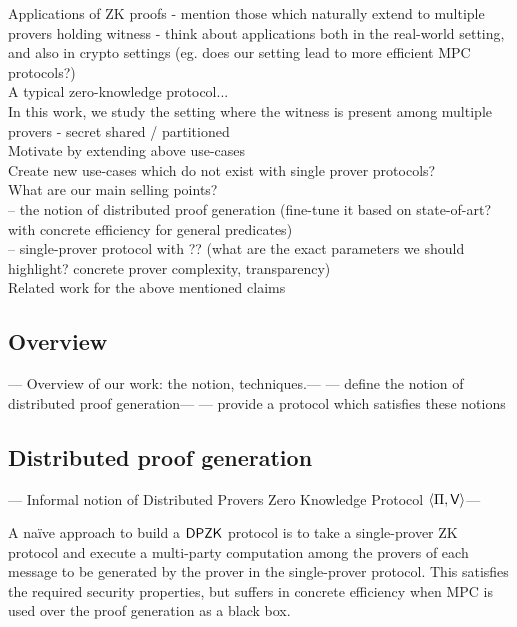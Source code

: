 Applications of ZK proofs - mention those which naturally extend to multiple provers holding witness - think about applications both in the real-world setting, and also in crypto settings (eg. does our setting lead to more efficient MPC protocols?)\\

A typical zero-knowledge protocol...\\
In this work, we study the setting where the witness is present among multiple provers - secret shared / partitioned \\
Motivate by extending above use-cases\\
Create new use-cases which do not exist with single prover protocols?\\

What are our main selling points?\\
-- the notion of distributed proof generation (fine-tune it based on state-of-art? with concrete efficiency for general predicates)\\
-- single-prover protocol with ?? (what are the exact parameters we should highlight? concrete prover complexity, transparency)\\

Related work for the above mentioned claims

\subsection{Overview}
--- Overview of our work: the notion, techniques.--- 
--- define the notion of distributed proof generation--- 
--- provide a protocol which satisfies these notions

\subsection*{Distributed proof generation}
--- Informal notion of Distributed Provers Zero Knowledge Protocol $\langle \Pi,\mathsf{V}\rangle$--- 

A na\"ive approach to build a $\mathsf{DPZK}$ protocol is to take a single-prover ZK protocol and execute a multi-party computation among the provers of each message to be generated by the prover in the single-prover protocol. This satisfies the required security properties, but suffers in concrete efficiency when MPC is used over the proof generation as a black box. 

